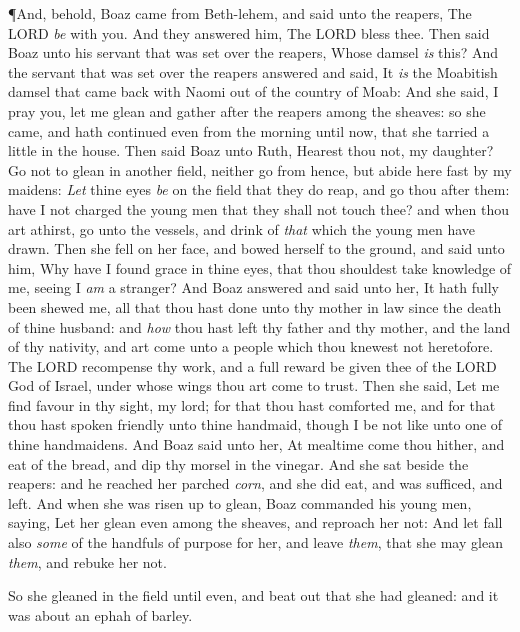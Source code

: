 \documentclass[11pt,letterpaper,oneside]{memoir}
\begin{document}
\P And, behold, Boaz came from Beth-lehem, and said unto the reapers,
The \textsc{LORD} \emph{be} with you. And they answered him, The
\textsc{LORD} bless thee.  Then said Boaz unto his servant that was
set over the reapers, Whose damsel \emph{is} this?  And the servant
that was set over the reapers answered and said, It \emph{is} the
Moabitish damsel that came back with Naomi out of the country of Moab:
And she said, I pray you, let me glean and gather after the reapers
among the sheaves: so she came, and hath continued even from the
morning until now, that she tarried a little in the house.  Then said
Boaz unto Ruth, Hearest thou not, my daughter? Go not to glean in
another field, neither go from hence, but abide here fast by my
maidens:  \emph{Let} thine eyes \emph{be} on the field that they do
reap, and go thou after them: have I not charged the young men that
they shall not touch thee? and when thou art athirst, go unto the
vessels, and drink of \emph{that} which the young men have drawn.
Then she fell on her face, and bowed herself to the ground, and said
unto him, Why have I found grace in thine eyes, that thou shouldest
take knowledge of me, seeing I \emph{am} a stranger?  And Boaz
answered and said unto her, It hath fully been shewed me, all that
thou hast done unto thy mother in law since the death of thine
husband: and \emph{how} thou hast left thy father and thy mother, and
the land of thy nativity, and art come unto a people which thou
knewest not heretofore.  The \textsc{LORD} recompense thy work, and a
full reward be given thee of the \textsc{LORD} God of Israel, under
whose wings thou art come to trust.  Then she said, Let me find favour
in thy sight, my lord; for that thou hast comforted me, and for that
thou hast spoken friendly unto thine handmaid, though I be not like
unto one of thine handmaidens.  And Boaz said unto her, At mealtime
come thou hither, and eat of the bread, and dip thy morsel in the
vinegar. And she sat beside the reapers: and he reached her parched
\emph{corn}, and she did eat, and was sufficed, and left.  And when
she was risen up to glean, Boaz commanded his young men, saying, Let
her glean even among the sheaves, and reproach her not:  And let fall
also \emph{some} of the handfuls of purpose for her, and leave
\emph{them}, that she may glean \emph{them}, and rebuke her not.

So she gleaned in the field until even, and beat out that she had
gleaned: and it was about an ephah of barley.
\end{document}
